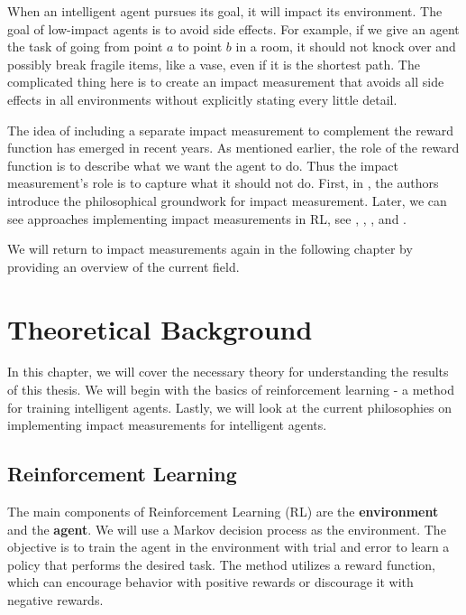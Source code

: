\documentclass[12pt,A4]{report}
\theoremstyle{definition}
\begin{document}
When an intelligent agent pursues its goal, it will impact its environment. The goal of low-impact agents is to avoid side effects. For example, if we give an agent the task of going from point $a$ to point $b$ in a room, it should not knock over and possibly break fragile items, like a vase, even if it is the shortest path. The complicated thing here is to create an impact measurement that avoids all side effects in all environments without explicitly stating every little detail.

The idea of including a separate impact measurement to complement the reward function has emerged in recent years. As mentioned earlier, the role of the reward function is to describe what we want the agent to do. Thus the impact measurement's role is to capture what it should not do. First, in \citet{ArmstrongLevinstein}, the authors introduce the philosophical groundwork for impact measurement. Later, we can see approaches implementing impact measurements in RL, see \citet{Eysenbach}, \citet{Krakovna19}, \citet{Turner19}, and \citet{Krakovna20}.

We will return to impact measurements again in the following chapter by providing an overview of the current field. 


 


\chapter{Theoretical Background}
In this chapter, we will cover the necessary theory for understanding the results of this thesis. We will begin with the basics of reinforcement learning - a method for training intelligent agents. Lastly, we will look at the current philosophies on implementing impact measurements for intelligent agents. 

\section{Reinforcement Learning}
The main components of Reinforcement Learning (RL) are the \textbf{environment} and the \textbf{agent}. We will use a Markov decision process as the environment. The objective is to train the agent in the environment with trial and error to learn a policy that performs the desired task. The method utilizes a reward function, which can encourage behavior with positive rewards or discourage it with negative rewards. 
\end{document}
